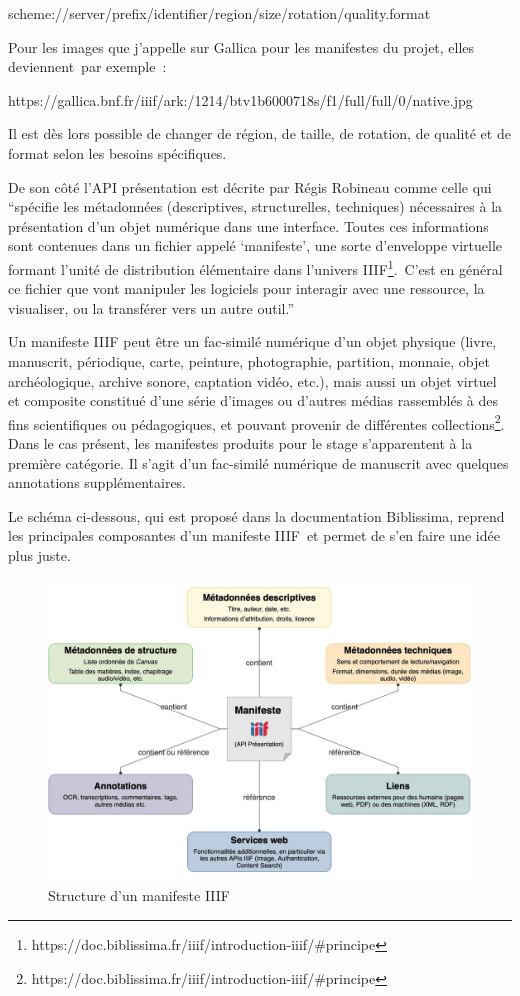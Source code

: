{scheme}://{server}{/prefix}/{identifier}/{region}/{size}/{rotation}/{quality}.{format}\par
Pour les images que j’appelle sur Gallica pour les manifestes du projet, elles deviennent par exemple~:\par 
https://gallica.bnf.fr/iiif/ark:/1214/btv1b6000718s/f1/full/full/0/native.jpg\par
Il est dès lors possible de changer de région, de taille, de rotation, de qualité et de format selon les besoins spécifiques.\par
De son côté l’API présentation est décrite par Régis Robineau comme celle qui \enquote{spécifie les métadonnées (descriptives, structurelles, techniques) nécessaires à la présentation d’un objet numérique dans une interface. Toutes ces informations sont contenues dans un fichier appelé \enquote{manifeste}, une sorte d’enveloppe virtuelle formant l’unité de distribution élémentaire dans l’univers IIIF\footnote{https://doc.biblissima.fr/iiif/introduction-iiif/\#principe}. C’est en général ce fichier que vont manipuler les logiciels pour interagir avec une ressource, la visualiser, ou la transférer vers un autre outil.}\par
Un manifeste IIIF peut être un fac-similé numérique d’un objet physique (livre, manuscrit, périodique, carte, peinture, photographie, partition, monnaie, objet archéologique, archive sonore, captation vidéo, etc.), mais aussi un objet virtuel et composite constitué d’une série d’images ou d’autres médias rassemblés à des fins scientifiques ou pédagogiques, et pouvant provenir de différentes collections\footnote{https://doc.biblissima.fr/iiif/introduction-iiif/\#principe}. Dans le cas présent, les manifestes produits pour le stage s’apparentent à la première catégorie. Il s’agit d’un fac-similé numérique de manuscrit avec quelques annotations supplémentaires.\par
Le schéma ci-dessous, qui est proposé dans la documentation Biblissima, reprend les principales composantes d’un manifeste IIIF et permet de s’en faire une idée plus juste.

\begin{figure}[H]
	\centering
	\includegraphics[scale=0.19]{./textes/chap4/schema-iiif.jpg}
	\caption{Structure d'un manifeste IIIF}
	\label{fig:info}
\end{figure}

